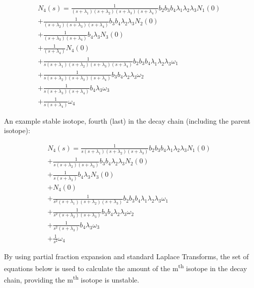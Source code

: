 \documentclass[12pt,twoside]{manual}
\begin{document}
\begin{equation}
\begin{split}
N_{4}(s) =
\frac{1}{(s+\lambda_1)(s+\lambda_2)(s+\lambda_3)(s+\lambda_4)} b_{2} b_{3} b_{4} \lambda_1 \lambda_2 \lambda_3 N_{1}(0) \\
+ \frac{1}{(s+\lambda_2)(s+\lambda_3)(s+\lambda_4)} b_{3} b_{4} \lambda_2 \lambda_3 N_{2}(0) \\
+ \frac{1}{(s+\lambda_3)(s+\lambda_4)} b_{4} \lambda_3 N_{3}(0) \\
+ \frac{1}{(s+\lambda_4)} N_{4}(0) \\
+ \frac{1}{s(s+\lambda_1)(s+\lambda_2)(s+\lambda_3)(s+\lambda_4)} b_{2} b_{3} b_{4} \lambda_1 \lambda_2 \lambda_3 \omega_{1} \\
+ \frac{1}{s(s+\lambda_2)(s+\lambda_3)(s+\lambda_4)} b_{3} b_{4} \lambda_2 \lambda_3 \omega_{2} \\
+ \frac{1}{s(s+\lambda_3)(s+\lambda_4)} b_{4} \lambda_3 \omega_{3} \\
+ \frac{1}{s(s+\lambda_4)} \omega_{4}
\end{split}
\end{equation}

An example stable isotope, fourth (last) in the decay chain (including the parent isotope):

\begin{equation}
\begin{split}
N_{4}(s) =
\frac{1}{s(s+\lambda_1)(s+\lambda_2)(s+\lambda_3)} b_{2} b_{3} b_{4} \lambda_1 \lambda_2 \lambda_3 N_{1}(0) \\
+ \frac{1}{s(s+\lambda_2)(s+\lambda_3)} b_{3} b_{4} \lambda_2 \lambda_3 N_{2}(0) \\
+ \frac{1}{s(s+\lambda_3)} b_{4} \lambda_3 N_{3}(0) \\
+ N_{4}(0) \\
+ \frac{1}{s^2(s+\lambda_1)(s+\lambda_2)(s+\lambda_3)} b_{2} b_{3} b_{4} \lambda_1 \lambda_2 \lambda_3 \omega_{1} \\
+ \frac{1}{s^2(s+\lambda_2)(s+\lambda_3)} b_{3} b_{4} \lambda_2 \lambda_3 \omega_{2} \\
+ \frac{1}{s^2(s+\lambda_3)} b_{4} \lambda_3 \omega_{3} \\
+ \frac{1}{s^2} \omega_{4}
\end{split}
\end{equation}

By using partial fraction expansion and standard Laplace Transforms, the set of equations below is used to calculate the amount of the m\textsuperscript{th} isotope in the decay chain, providing the m\textsuperscript{th} isotope is unstable.
\end{document}
